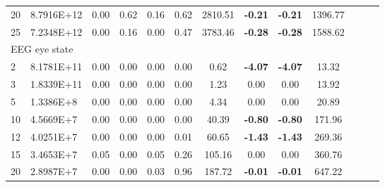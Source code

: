 {\begin{longtable}{@{}llccccccccccc@{}}
\multicolumn{1}{l|}{20} & \multicolumn{1}{l|}{8.7916E+12} & \multicolumn{1}{c|}{0.00}    & \multicolumn{1}{c|}{0.62} & \multicolumn{1}{c|}{0.16}   & 0.62 & \multicolumn{1}{c|}{2810.51}  & \textbf{-0.21}  & \textbf{-0.21}  & 1396.77   \\
\multicolumn{1}{l|}{25} & \multicolumn{1}{l|}{7.2348E+12} & \multicolumn{1}{c|}{0.00}    & \multicolumn{1}{c|}{0.16} & \multicolumn{1}{c|}{0.00}   & 0.47 & \multicolumn{1}{c|}{3783.46}  & \textbf{-0.28}  & \textbf{-0.28}  & 1588.62   \\ \hline
\multicolumn{10}{l}{EEG eye state}                                                                                                                                                                                                        \\ \hline
\multicolumn{1}{l|}{2}  & \multicolumn{1}{l|}{8.1781E+11} & \multicolumn{1}{c|}{0.00}    & \multicolumn{1}{c|}{0.00} & \multicolumn{1}{c|}{0.00}   & 0.00 & \multicolumn{1}{c|}{0.62}     & \textbf{-4.07}  & \textbf{-4.07}  & 13.32     \\
\multicolumn{1}{l|}{3}  & \multicolumn{1}{l|}{1.8339E+11} & \multicolumn{1}{c|}{0.00}    & \multicolumn{1}{c|}{0.00} & \multicolumn{1}{c|}{0.00}   & 0.00 & \multicolumn{1}{c|}{1.23}     & 0.00            & 0.00            & 13.92     \\
\multicolumn{1}{l|}{5}  & \multicolumn{1}{l|}{1.3386E+8}  & \multicolumn{1}{c|}{0.00}    & \multicolumn{1}{c|}{0.00} & \multicolumn{1}{c|}{0.00}   & 0.00 & \multicolumn{1}{c|}{4.34}     & 0.00            & 0.00            & 20.89     \\
\multicolumn{1}{l|}{10} & \multicolumn{1}{l|}{4.5669E+7}  & \multicolumn{1}{c|}{0.00}    & \multicolumn{1}{c|}{0.00} & \multicolumn{1}{c|}{0.00}   & 0.00 & \multicolumn{1}{c|}{40.39}    & \textbf{-0.80}  & \textbf{-0.80}  & 171.96    \\
\multicolumn{1}{l|}{12} & \multicolumn{1}{l|}{4.0251E+7}  & \multicolumn{1}{c|}{0.00}    & \multicolumn{1}{c|}{0.00} & \multicolumn{1}{c|}{0.00}   & 0.01 & \multicolumn{1}{c|}{60.65}    & \textbf{-1.43}  & \textbf{-1.43}  & 269.36    \\
\multicolumn{1}{l|}{15} & \multicolumn{1}{l|}{3.4653E+7}  & \multicolumn{1}{c|}{0.05}    & \multicolumn{1}{c|}{0.00} & \multicolumn{1}{c|}{0.05}   & 0.26 & \multicolumn{1}{c|}{105.16}   & 0.00            & 0.00            & 360.76    \\
\multicolumn{1}{l|}{20} & \multicolumn{1}{l|}{2.8987E+7}  & \multicolumn{1}{c|}{0.00}    & \multicolumn{1}{c|}{0.00} & \multicolumn{1}{c|}{0.03}   & 0.96 & \multicolumn{1}{c|}{187.72}   & \textbf{-0.01}  & \textbf{-0.01}  & 647.22    \\

\end{longtable}}
